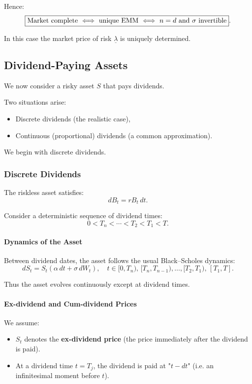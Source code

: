 \documentclass[12pt,a4paper]{article}
\theoremstyle{definition}
\begin{document}
Hence:
\[
\fbox{Market complete $\iff$ unique EMM $\iff$ $n = d$ and $\sigma$ invertible}.
\]

In this case the market price of risk $\underline{\lambda}$ is uniquely determined.

\subsection{Dividend-Paying Assets}

We now consider a risky asset $S$ that pays dividends.

Two situations arise:
\begin{itemize}
\item Discrete dividends (the realistic case),
\item Continuous (proportional) dividends (a common approximation).
\end{itemize}

We begin with discrete dividends.

\subsubsection{Discrete Dividends}

The riskless asset satisfies:
\[
dB_t = r B_t \, dt.
\]

Consider a deterministic sequence of dividend times:
\[
0 < T_n < \cdots < T_2 < T_1 < T.
\]

\paragraph{Dynamics of the Asset}

Between dividend dates, the asset follows the usual Black--Scholes dynamics:
\[
dS_t = S_t(\alpha \, dt + \sigma \, dW_t), \quad t \in [0, T_n), \, [T_n, T_{n-1}), \ldots, [T_2, T_1), \, [T_1, T].
\]

Thus the asset evolves continuously except at dividend times.

\paragraph{Ex-dividend and Cum-dividend Prices}

We assume:
\begin{itemize}
\item $S_t$ denotes the \textbf{ex-dividend price} (the price immediately after the dividend is paid).
\item At a dividend time $t = T_j$, the dividend is paid at "$t - dt$" (i.e. an infinitesimal moment before $t$).
\end{itemize}
\end{document}
